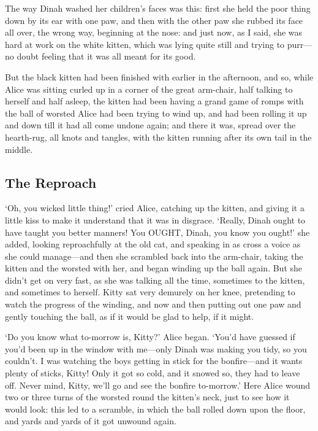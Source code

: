   The way Dinah washed her children's faces was this:  first she
held the poor thing down by its ear with one paw, and then with
the other paw she rubbed its face all over, the wrong way,
beginning at the nose:  and just now, as I said, she was hard at
work on the white kitten, which was lying quite still and trying
to purr---no doubt feeling that it was all meant for its good.

  But the black kitten had been finished with earlier in the
afternoon, and so, while Alice was sitting curled up in a corner
of the great arm-chair, half talking to herself and half asleep,
the kitten had been having a grand game of romps with the ball of
worsted Alice had been trying to wind up, and had been rolling it
up and down till it had all come undone again; and there it was,
spread over the hearth-rug, all knots and tangles, with the
kitten running after its own tail in the middle.

\subsection{The Reproach}

  `Oh, you wicked little thing!' cried Alice, catching up the
kitten, and giving it a little kiss to make it understand that it
was in disgrace.  `Really, Dinah ought to have taught you better
manners!  You OUGHT, Dinah, you know you ought!' she added,
looking reproachfully at the old cat, and speaking in as cross a
voice as she could manage---and then she scrambled back into the
arm-chair, taking the kitten and the worsted with her, and began
winding up the ball again.  But she didn't get on very fast, as
she was talking all the time, sometimes to the kitten, and
sometimes to herself.  Kitty sat very demurely on her knee,
pretending to watch the progress of the winding, and now and then
putting out one paw and gently touching the ball, as if it would
be glad to help, if it might.

  `Do you know what to-morrow is, Kitty?' Alice began.  `You'd
have guessed if you'd been up in the window with me---only Dinah
was making you tidy, so you couldn't.  I was watching the boys
getting in stick for the bonfire---and it wants plenty of
sticks, Kitty!  Only it got so cold, and it snowed so, they had
to leave off.  Never mind, Kitty, we'll go and see the bonfire
to-morrow.'  Here Alice wound two or three turns of the worsted
round the kitten's neck, just to see how it would look:  this led
to a scramble, in which the ball rolled down upon the floor, and
yards and yards of it got unwound again.

